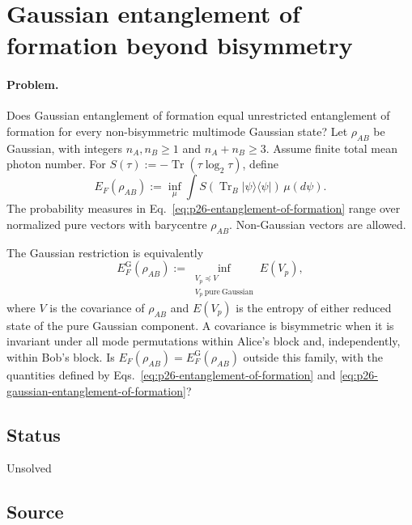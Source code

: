 \section{Gaussian entanglement of formation beyond bisymmetry}
\label{sec:op_4a4434b5cc6e85e6}

\paragraph{Problem.}
Does Gaussian entanglement of formation equal unrestricted entanglement of formation for every non-bisymmetric multimode Gaussian state? Let $\rho_{AB}$ be Gaussian, with integers $n_A,n_B\geq1$ and $n_A+n_B\geq3$. Assume finite total mean photon number. For $S(\tau):=-\operatorname{Tr}(\tau\log_2\tau)$, define
\begin{equation}
E_F(\rho_{AB}):=\inf_{\mu}\int
S(\operatorname{Tr}_B|\psi\rangle\langle\psi|)\,\mu(d\psi).
\label{eq:p26-entanglement-of-formation}
\end{equation}
The probability measures in Eq.~\eqref{eq:p26-entanglement-of-formation} range over normalized pure vectors with barycentre $\rho_{AB}$. Non-Gaussian vectors are allowed.

The Gaussian restriction is equivalently
\begin{equation}
E_F^{\mathrm G}(\rho_{AB}):=
\inf_{\substack{V_p\preceq V\\V_p\ \mathrm{pure\ Gaussian}}}E(V_p),
\label{eq:p26-gaussian-entanglement-of-formation}
\end{equation}
where $V$ is the covariance of $\rho_{AB}$ and $E(V_p)$ is the entropy of either reduced state of the pure Gaussian component. A covariance is bisymmetric when it is invariant under all mode permutations within Alice's block and, independently, within Bob's block. Is $E_F(\rho_{AB})=E_F^{\mathrm G}(\rho_{AB})$ outside this family, with the quantities defined by Eqs.~\eqref{eq:p26-entanglement-of-formation} and \eqref{eq:p26-gaussian-entanglement-of-formation}?

\subsection*{Status}

Unsolved

\subsection*{Source}

